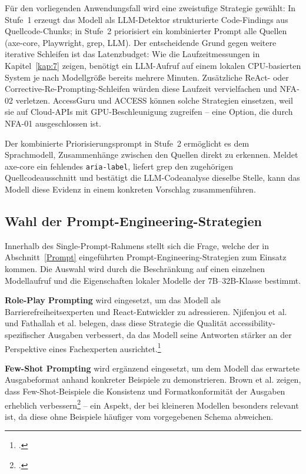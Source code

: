 Für den vorliegenden Anwendungsfall wird eine zweistufige Strategie gewählt: In Stufe~1 erzeugt das Modell als LLM-Detektor strukturierte Code-Findings aus Quellcode-Chunks; in Stufe~2 priorisiert ein kombinierter Prompt alle Quellen (axe-core, Playwright, grep, LLM). Der entscheidende Grund gegen weitere iterative Schleifen ist das Latenzbudget: Wie die Laufzeitmessungen in Kapitel~\ref{kap:7} zeigen, benötigt ein \ac{LLM}-Aufruf auf einem lokalen \ac{CPU}-basierten System je nach Modellgröße bereits mehrere Minuten. Zusätzliche ReAct- oder Corrective-Re-Prompting-Schleifen würden diese Laufzeit vervielfachen und \ac{NFA}-02 verletzen. AccessGuru und ACCESS können solche Strategien einsetzen, weil sie auf Cloud-\ac{API}s mit \ac{GPU}-Beschleunigung zugreifen -- eine Option, die durch \ac{NFA}-01 ausgeschlossen ist.

Der kombinierte Priorisierungsprompt in Stufe~2 ermöglicht es dem Sprachmodell, Zusammenhänge zwischen den Quellen direkt zu erkennen. Meldet axe-core ein fehlendes \texttt{aria-label}, liefert grep den zugehörigen Quellcodeausschnitt und bestätigt die LLM-Codeanalyse dieselbe Stelle, kann das Modell diese Evidenz in einem konkreten Vorschlag zusammenführen.

\subsection{Wahl der Prompt-Engineering-Strategien}

Innerhalb des Single-Prompt-Rahmens stellt sich die Frage, welche der in Abschnitt~\ref{Prompt} eingeführten Prompt-Engineering-Strategien zum Einsatz kommen. Die Auswahl wird durch die Beschränkung auf einen einzelnen Modellaufruf und die Eigenschaften lokaler Modelle der 7B--32B-Klasse bestimmt.

\textbf{Role-Play Prompting} wird eingesetzt, um das Modell als Barrierefreiheitsexperten und React-Entwickler zu adressieren. Njifenjou et al. und Fathallah et al. belegen, dass diese Strategie die Qualität accessibility-spezifischer Ausgaben verbessert, da das Modell seine Antworten stärker an der Perspektive eines Fachexperten ausrichtet.\footcites[Vgl.][]{njifenjou_role-play_2024}[Vgl.][]{fathallah_accessguru_2025}

\textbf{Few-Shot Prompting} wird ergänzend eingesetzt, um dem Modell das erwartete Ausgabeformat anhand konkreter Beispiele zu demonstrieren. Brown et al. zeigen, dass Few-Shot-Beispiele die Konsistenz und Formatkonformität der Ausgaben erheblich verbessern\footcite[Vgl.][S.~5]{brown2020gpt3fewshot} -- ein Aspekt, der bei kleineren Modellen besonders relevant ist, da diese ohne Beispiele häufiger vom vorgegebenen Schema abweichen.

